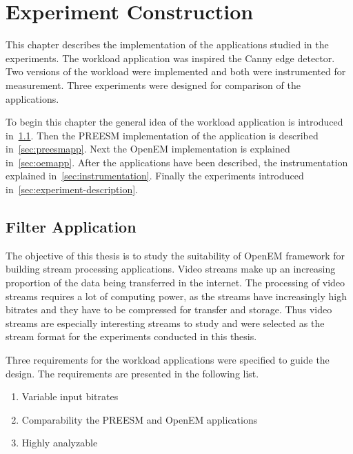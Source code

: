 \chapter{Experiment Construction}
\label{chapter:construction}
This chapter describes the implementation of the applications studied in the experiments. The workload application was inspired the Canny edge detector. Two versions of the workload were implemented and both were instrumented for measurement. Three experiments were designed for comparison of the applications.

To begin this chapter the general idea of the workload application is introduced in~\ref{sec:filterapp}. Then the PREESM implementation of the application is described in~\ref{sec:preesmapp}. Next the OpenEM implementation is explained in~\ref{sec:oemapp}. After the applications have been described, the instrumentation explained in~\ref{sec:instrumentation}. Finally the experiments introduced in~\ref{sec:experiment-description}.

\section{Filter Application}
\label{sec:filterapp}
The objective of this thesis is to study the suitability of OpenEM framework for building stream processing applications. Video streams make up an increasing proportion of the data being transferred in the internet. The processing of video streams requires a lot of computing power, as the streams have increasingly high bitrates and they have to be compressed for transfer and storage. Thus video streams are especially interesting streams to study and were selected as the stream format for the experiments conducted in this thesis.

Three requirements for the workload applications were specified to guide the design. The requirements are presented in the following list.

\begin{enumerate}
    \item{Variable input bitrates}
    \item{Comparability the PREESM and OpenEM applications}
    \item{Highly analyzable}
\end{enumerate}

